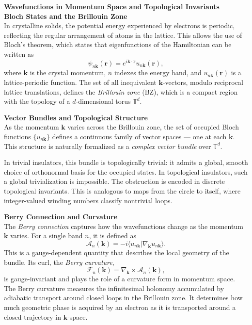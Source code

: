 \begin{technical}
{\Large\textbf{Wavefunctions in Momentum Space and Topological Invariants}}\\[0.3em]

\textbf{Bloch States and the Brillouin Zone}\\[0.5em]
In crystalline solids, the potential energy experienced by electrons is periodic, reflecting the regular arrangement of atoms in the lattice. This allows the use of Bloch's theorem, which states that eigenfunctions of the Hamiltonian can be written as
\[
\psi_{n\mathbf{k}}(\mathbf{r}) = e^{i \mathbf{k} \cdot \mathbf{r}} u_{n\mathbf{k}}(\mathbf{r}),
\]
where \( \mathbf{k} \) is the crystal momentum, \( n \) indexes the energy band, and \( u_{n\mathbf{k}}(\mathbf{r}) \) is a lattice-periodic function. The set of all inequivalent \( \mathbf{k} \)-vectors, modulo reciprocal lattice translations, defines the \emph{Brillouin zone} (BZ), which is a compact region with the topology of a \(d\)-dimensional torus \( \mathbb{T}^d \).

\textbf{Vector Bundles and Topological Structure}\\[0.5em]
As the momentum \( \mathbf{k} \) varies across the Brillouin zone, the set of occupied Bloch functions \( \{ u_{n\mathbf{k}} \} \) defines a continuous family of vector spaces — one at each \( \mathbf{k} \). This structure is naturally formalized as a \emph{complex vector bundle} over \( \mathbb{T}^d \).

In trivial insulators, this bundle is topologically trivial: it admits a global, smooth choice of orthonormal basis for the occupied states. In topological insulators, such a global trivialization is impossible. The obstruction is encoded in discrete topological invariants. This is analogous to maps from the circle to itself, where integer-valued winding numbers classify nontrivial loops.

\textbf{Berry Connection and Curvature}\\[0.5em]
The \emph{Berry connection} captures how the wavefunctions change as the momentum \(\mathbf{k}\) varies. For a single band \( n \), it is defined as
\[
\mathcal{A}_n(\mathbf{k}) = -i \langle u_{n\mathbf{k}} | \nabla_{\mathbf{k}} u_{n\mathbf{k}} \rangle.
\]
This is a gauge-dependent quantity that describes the local geometry of the bundle. Its curl, the \emph{Berry curvature},
\[
\mathcal{F}_n(\mathbf{k}) = \nabla_{\mathbf{k}} \times \mathcal{A}_n(\mathbf{k}),
\]
is gauge-invariant and plays the role of a curvature form in momentum space. The Berry curvature measures the infinitesimal holonomy accumulated by adiabatic transport around closed loops in the Brillouin zone. It determines how much geometric phase is acquired by an electron as it is transported around a closed trajectory in \(\mathbf{k}\)-space.
\columnbreak


\end{technical}
